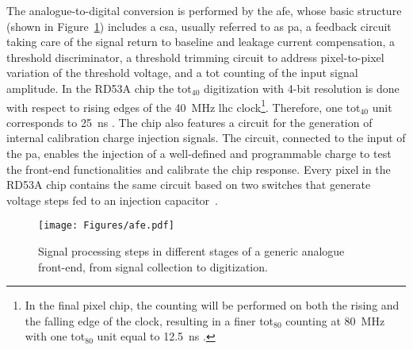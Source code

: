 The analogue-to-digital conversion is performed by the \gls{afe}, whose basic structure (shown in Figure~\ref{fig:afesteps}) includes a \gls{csa}, usually referred to as \gls{pa}, a feedback circuit taking care of the signal return to baseline and leakage current compensation, a threshold discriminator, a threshold trimming circuit to address pixel-to-pixel variation of the threshold voltage, and a \gls{tot} counting of the input signal amplitude. In the RD53A chip the \gls{tot}$_{40}$ digitization with 4-bit resolution is done with respect to rising edges of the \SI{40}{\mega\hertz} \gls{lhc} clock\footnote{In the final pixel chip, the counting will be performed on both the rising and the falling edge of the clock, resulting in a finer \gls{tot}$_{80}$ counting at \SI{80}{\mega\hertz} with one \gls{tot}$_{80}$ unit equal to \SI{12.5}{\nano\second} \cite{rd53b_manual}.}. Therefore, one \gls{tot}$_{40}$ unit corresponds to \SI{25}{\nano\second} \cite{rd53a_manual}.
The chip also features a circuit for the generation of internal calibration charge injection signals. The circuit, connected to the input of the \gls{pa}, enables the injection of a well-defined and programmable charge to test the front-end functionalities and calibrate the chip response. Every pixel in the RD53A chip contains the same circuit based on two switches that generate voltage steps fed to an injection capacitor~\citep{rd53a_manual}.

\begin{figure}[t]
    \centering
    \texttt{[image: Figures/afe.pdf]}
    \caption{Signal processing steps in different stages of a generic analogue front-end, from signal collection to digitization.}
    \label{fig:afesteps}
\end{figure}

